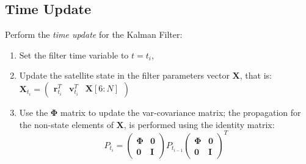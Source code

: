 \subsection{Time Update} \label{ssec:time-update}
Perform the \emph{time update} for the Kalman Filter:
\begin{enumerate}
    \item Set the filter time variable to $t=t_i$,
    \item Update the satellite state in the filter parameters vector $\bm{X}$, 
        that is: $\bm{X}_{t_i} = \begin{pmatrix} \bm{r}^T_{t_i} & \bm{v}^T_{t_i} & \bm{X}[6:N] \end{pmatrix}$
    \item Use the $\bm{\Phi}$ matrix to update the var-covariance matrix; the 
        propagation for the non-state elements of $\bm{X}$, is performed using 
        the identity matrix:
        \begin{equation}
            P_{t_i} = \begin{pmatrix} \bm{\Phi} & \bm{0} \\ \bm{0} & \bm{I} \end{pmatrix} 
                P_{t_{i-1}} 
                \begin{pmatrix} \bm{\Phi} & \bm{0} \\ \bm{0} & \bm{I} \end{pmatrix} ^T
        \end{equation}
\end{enumerate}


